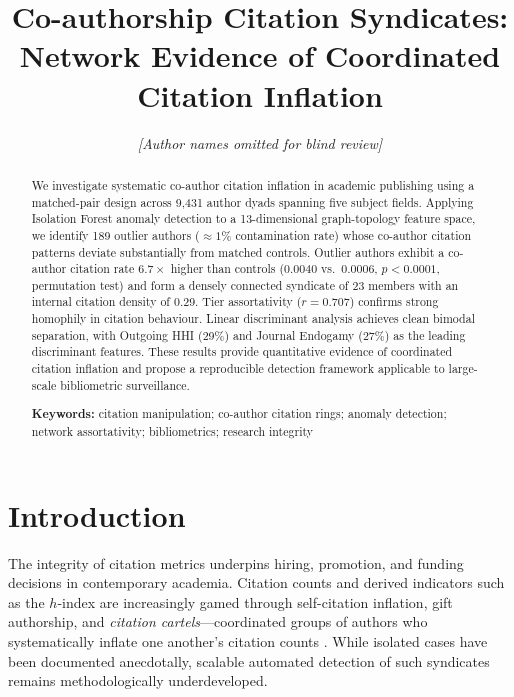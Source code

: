 \documentclass[12pt,a4paper]{article}
\title{\textbf{Co-authorship Citation Syndicates:\\
       Network Evidence of Coordinated Citation Inflation}}
\author{
  \textit{[Author names omitted for blind review]}
}
\date{}
\begin{document}
\maketitle

\begin{abstract}
\noindent
We investigate systematic co-author citation inflation in academic
publishing using a matched-pair design across 9{,}431 author dyads
spanning five subject fields.
Applying Isolation Forest anomaly detection to a 13-dimensional
graph-topology feature space, we identify 189 outlier authors
($\approx1\%$ contamination rate) whose co-author citation patterns
deviate substantially from matched controls.
Outlier authors exhibit a co-author citation rate $6.7\times$ higher
than controls (0.0040 vs.\ 0.0006, $p < 0.0001$, permutation test)
and form a densely connected syndicate of 23 members with an
internal citation density of 0.29.
Tier assortativity ($r = 0.707$) confirms strong homophily in
citation behaviour.
Linear discriminant analysis achieves clean bimodal separation,
with Outgoing HHI (29\%) and Journal Endogamy (27\%) as the leading
discriminant features.
These results provide quantitative evidence of coordinated citation
inflation and propose a reproducible detection framework applicable
to large-scale bibliometric surveillance.

\medskip\noindent\textbf{Keywords:}
citation manipulation; co-author citation rings; anomaly detection;
network assortativity; bibliometrics; research integrity
\end{abstract}

\newpage

\section{Introduction}\label{sec:intro}

The integrity of citation metrics underpins hiring, promotion, and
funding decisions in contemporary academia.
Citation counts and derived indicators such as the $h$-index are
increasingly gamed through self-citation inflation, gift authorship,
and \emph{citation cartels}---coordinated groups of authors who
systematically inflate one another's citation counts
\citep[e.g.,][]{vannoorden2013, fister2016}.
While isolated cases have been documented anecdotally, scalable
automated detection of such syndicates remains methodologically
underdeveloped.
\end{document}
